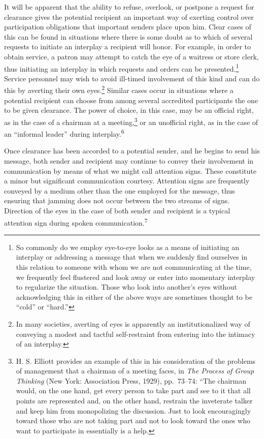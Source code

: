 \documentclass[openany,nobib]{tufte-book}
\begin{document}
It will be apparent that the ability to refuse, overlook, or postpone a
request for clearance gives the potential recipient an important way of
exerting control over participation obligations that important senders
place upon him. Clear cases of this can be found in situations where
there is some doubt as to which of several requests to initiate an
interplay a recipient will honor. For example, in order to obtain
service, a patron may attempt to catch the eye of a waitress or store
clerk, thus initiating an interplay in which requests and orders can be
presented.\footnote{So commonly do we employ eye-to-eye looks as a means
  of initiating an interplay or addressing a message that when we
  suddenly find ourselves in this relation to someone with whom we are
  not communicating at the time, we frequently feel flustered and look
  away or enter into momentary interplay to regularize the situation.
  Those who look into another's eyes without acknowledging this in
  either of the above ways are sometimes thought to be ``cold'' or
  ``hard.''} Service personnel may wish to avoid ill-timed involvement
of this kind and can do this by averting their own eyes.\footnote{In
  many societies, averting of eyes is apparently an institutionalized
  way of conveying a modest and tactful self-restraint from entering
  into the intimacy of an interplay.} Similar cases occur in situations
where a potential recipient can choose from among several accredited
participants the one to be given clearance. The power of choice, in this
case, may be an official right, as in the case of a chairman at a
meeting,\footnote{H. S. Elliott provides an example of this in his
  consideration of the problems of management that a chairman of a
  meeting faces, in \emph{The Process of Group Thinking} (New York:
  Association Press, 1929), pp.~73--74: ``The chairman would, on the one
  hand, get every person to take part and see to it that all points are
  represented and, on the other hand, restrain the inveterate talker and
  keep him from monopolizing the discussion. Just to look encouragingly
  toward those who are not taking part and not to look toward the ones
  who want to participate in essentially is a help.} or an unofficial
right, as in the case of an ``informal leader'' during
interplay.\textsuperscript{6}

Once clearance has been accorded to a potential sender, and he begins to
send his message, both sender and recipient may continue to convey their
involvement in communication by means of what we might call attention
signs. These constitute a minor but significant communication courtesy.
Attention signs are frequently conveyed by a medium other than the one
employed for the message, thus ensuring that jamming does not occur
between the two streams of signs. Direction of the eyes in the case of
both sender and recipient is a typical attention sign during spoken
communication.\textsuperscript{7}
\end{document}
